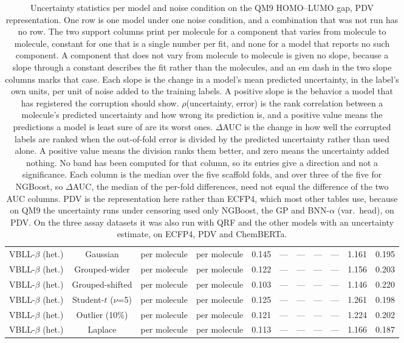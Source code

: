 \begin{table}[!htbp]
\begin{adjustbox}{max width=\textwidth,max totalheight=0.78\textheight}
\begin{tabular}{lcccccccccc}
VBLL-$\beta$ (het.) & Gaussian & per molecule & per molecule & 0.145 & --- & --- & --- & --- & 1.161 & 0.195 \\
VBLL-$\beta$ (het.) & Grouped-wider & per molecule & per molecule & 0.122 & --- & --- & --- & --- & 1.156 & 0.203 \\
VBLL-$\beta$ (het.) & Grouped-shifted & per molecule & per molecule & 0.103 & --- & --- & --- & --- & 1.146 & 0.220 \\
VBLL-$\beta$ (het.) & Student-$t$ ($\nu$=5) & per molecule & per molecule & 0.125 & --- & --- & --- & --- & 1.261 & 0.198 \\
VBLL-$\beta$ (het.) & Outlier (10\%) & per molecule & per molecule & 0.121 & --- & --- & --- & --- & 1.224 & 0.202 \\
VBLL-$\beta$ (het.) & Laplace & per molecule & per molecule & 0.113 & --- & --- & --- & --- & 1.166 & 0.187 \\
\bottomrule
\end{tabular}
\end{adjustbox}
\caption[Uncertainty statistics per model and noise condition on QM9.]{Uncertainty statistics per model and noise condition on the QM9 HOMO--LUMO gap, PDV representation. One row is one model under one noise condition, and a combination that was not run has no row. The two support columns print per molecule for a component that varies from molecule to molecule, constant for one that is a single number per fit, and none for a model that reports no such component. A component that does not vary from molecule to molecule is given no slope, because a slope through a constant describes the fit rather than the molecules, and an em dash in the two slope columns marks that case. Each slope is the change in a model's mean predicted uncertainty, in the label's own units, per unit of noise added to the training labels. A positive slope is the behavior a model that has registered the corruption should show. $\rho$(uncertainty, error) is the rank correlation between a molecule's predicted uncertainty and how wrong its prediction is, and a positive value means the predictions a model is least sure of are its worst ones. $\Delta$AUC is the change in how well the corrupted labels are ranked when the out-of-fold error is divided by the predicted uncertainty rather than used alone. A positive value means the division ranks them better, and zero means the uncertainty added nothing. No band has been computed for that column, so its entries give a direction and not a significance. Each column is the median over the five scaffold folds, and over three of the five for NGBoost, so $\Delta$AUC, the median of the per-fold differences, need not equal the difference of the two AUC columns. PDV is the representation here rather than ECFP4, which most other tables use, because on QM9 the uncertainty runs under censoring used only NGBoost, the GP and BNN-$\alpha$ (var.\ head), on PDV. On the three assay datasets it was also run with QRF and the other models with an uncertainty estimate, on ECFP4, PDV and ChemBERTa.}
\label{tab:uncertainty}
\end{table}

